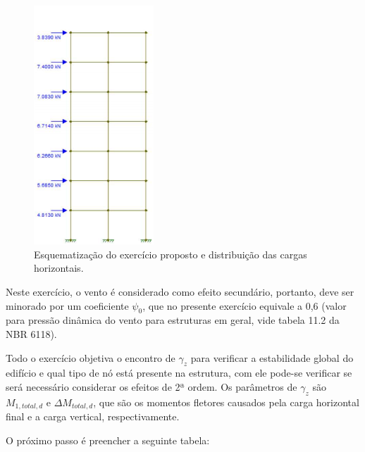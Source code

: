 \begin{figure}[H]
	\begin{center}
	\caption{Esquematização do exercício proposto e distribuição das cargas horizontais.}
    	\includegraphics[width=0.4\textwidth]{Exercicios/Imagens/Exercicio-portico.png}
	\end{center}
\end{figure}

Neste exercício, o vento é considerado como efeito secundário, portanto, deve ser minorado por um coeficiente $\psi_0$, que no presente exercício equivale a 0,6 (valor para pressão dinâmica do vento para estruturas em geral, vide tabela 11.2 da NBR 6118).

Todo o exercício objetiva o encontro de $\gamma_z$ para verificar a estabilidade global do edifício e qual tipo de nó está presente na estrutura, com ele pode-se verificar se será necessário considerar os efeitos de 2ª ordem. Os parâmetros de $\gamma_z$ são $M_{1, total, d}$ e $\Delta M_{total, d}$, que são os momentos fletores causados pela carga horizontal final e a carga vertical, respectivamente.

O próximo passo é preencher a seguinte tabela:

